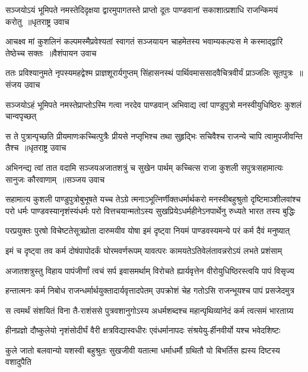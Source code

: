 \threelineshloka
{सञ्जयोऽयं भूमिपते नमस्तेदिदृक्षया द्वारमुपागतस्ते}
{प्राप्तो दूतः पाण्डवानां सकाशात्प्रशाधि राजन्किमयं करोतु ॥धृतराष्ट्र उवाच}
{}


\twolineshloka
{आचक्ष्व मां कुशलिनं कल्पमस्मैप्रवेश्यतां स्वागतं सञ्जयायन चाहमेतस्य भवाम्यकल्पःस मे कस्माद्द्वारि तेष्ठेच्च सक्तः ॥वैशंपायन उवाच}
{}


\threelineshloka
{ततः प्रविश्यानुमते नृपस्यमहद्वेश्म प्राज्ञशूरार्यगुप्तम्}
{सिंहासनस्थं पार्थिवमाससादवैचित्रवीर्यं प्राञ्जलिः सूतपुत्रः ॥संजय उवाच}
{}


\twolineshloka
{सञ्जयोऽहं भूमिपते नमस्तेप्राप्तोऽस्मि गत्वा नरदेव पाण्डवान्}
{अभिवाद्य त्वां पाण्डुपुत्रो मनस्वीयुधिष्ठिरः कुशलं चान्वपृच्छत्}


\threelineshloka
{स ते पुत्रान्पृच्छति प्रीयमाणःकच्चित्पुत्रैः प्रीयसे नप्तृभिश्च}
{तथा सुहृद्भिः सचिवैश्च राजन्ये चापि त्वामुपजीवन्ति तैश्च ॥धृतराष्ट्र उवाच}
{}


\threelineshloka
{अभिनन्द्य त्वां तात वदामि सञ्जयअजातशत्रुं च सुखेन पार्थम्}
{कच्चित्स राजा कुशली सपुत्रःसहामात्यः सानुजः कौरवाणाम् ॥सञ्जय उवाच}
{}


सहामात्य कुशली पाण्डुपुत्रोबुभूषते यच्च तेऽग्रे त्मनाऽभूत्निर्णीक्तधर्मार्थकरो मनस्वीबहुश्रुतो दृष्टिमाञ्शीलवांश्च
\twolineshloka
{परो धर्मः पाण्डवस्यानृशंस्यंधर्मः परो वित्तचयान्मतोऽस्य}
{सुखप्रियेऽधर्महीनेऽनपार्थेनु रुध्यते भारत तस्य बुद्धिः}


\twolineshloka
{परप्रयुक्तः पुरषो विचेष्टतेसूत्रप्रोता दारुमयीव योषा}
{इमं दृष्ट्वा नियमं पाण्डवस्यमन्ये परं कर्म दैवं मनुष्यात्}


\twolineshloka
{इमं च दृष्ट्वा तव कर्म दोषंपापोदर्कं घोरमवर्णरूपम्}
{यावत्परः कामयतेऽतिवेलंतावन्नरोऽयं लभते प्रशंसाम्}


\twolineshloka
{अजातशत्रुस्तु विहाय पापंजीर्णां त्वचं सर्प इवासमर्थाम्}
{विरोचते ह्यार्यवृत्तेन वीरोयुधिष्ठिरस्त्वयि पापं विसृज्य}


\twolineshloka
{हन्तात्मनः कर्म निबोध राजन्धर्मार्थयुक्तादार्यवृत्तादपेतम्}
{उपक्रोशं चेह गतोऽसि राजन्भूयश्च पापं प्रसजेदमुत्र}


\twolineshloka
{स त्वमर्थं संशयितं विना तै-राशंससे पुत्रवशानुगोऽस्य}
{अधर्मशब्दश्च महान्पृथिव्यांनेदं कर्म त्वत्समं भारताग्र्य}


\twolineshloka
{हीनप्रज्ञो दौष्कुलेयो नृशंसोदीर्घं वैरी क्षत्रविद्यास्वधीरः}
{एवंधर्मानापदः संश्रयेयु-र्हीनवीर्यो यश्च भवेदशिष्टः}


\threelineshloka
{कुले जातो बलवान्यो यशस्वी}
{बहुश्रुतः सुखजीवी यतात्मा}
{धर्माधर्मौ ग्रथितौ यो बिभर्तिस ह्यस्य दिष्टस्य वशादुपैति}


